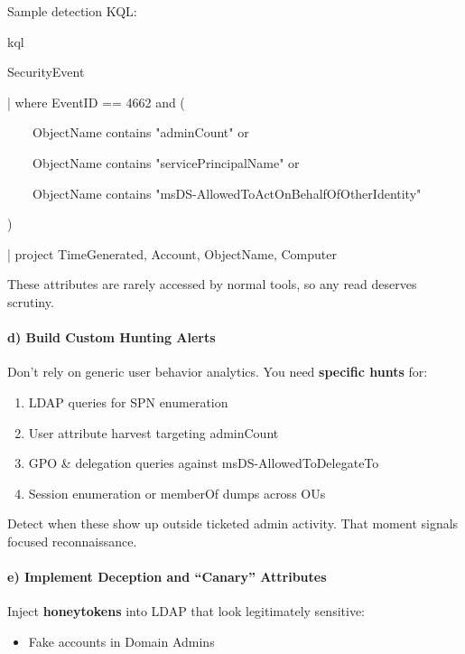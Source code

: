 {{\begin{itemize}
\end{itemize}
Sample detection KQL:

kql

 

SecurityEvent

| where EventID == 4662 and (

    ObjectName contains "adminCount" or 

    ObjectName contains "servicePrincipalName" or 

    ObjectName contains "msDS-AllowedToActOnBehalfOfOtherIdentity"

)

| project TimeGenerated, Account, ObjectName, Computer

These attributes are rarely accessed by normal tools, so any read deserves scrutiny.

\paragraph{\textbf{   d) Build Custom Hunting Alerts}}

Don’t rely on generic user behavior analytics. You need \textbf{specific hunts} for:

\begin{enumerate}
    \item LDAP queries for SPN enumeration

    \item User attribute harvest targeting adminCount

    \item GPO \& delegation queries against msDS-AllowedToDelegateTo

    \item Session enumeration or memberOf dumps across OUs

\end{enumerate}
Detect when these show up outside ticketed admin activity. That moment signals focused reconnaissance.

\paragraph{\textbf{   e) Implement Deception and “Canary” Attributes}}

Inject \textbf{honeytokens} into LDAP that look legitimately sensitive:

\begin{itemize}
    \item Fake accounts in Domain Admins


\end{itemize}}}
